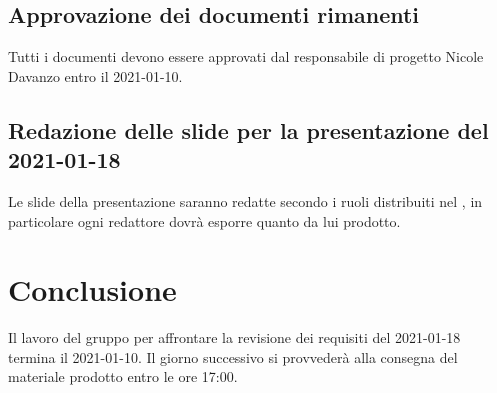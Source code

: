 \subsection{Approvazione dei documenti rimanenti}
Tutti i documenti devono essere approvati dal responsabile di progetto Nicole Davanzo entro il 2021-01-10.

\subsection{Redazione delle slide per la presentazione del 2021-01-18}
Le slide della presentazione saranno redatte secondo i ruoli distribuiti nel \textit{}, in particolare ogni redattore dovrà esporre quanto da lui prodotto.

\section{Conclusione}
Il lavoro del gruppo per affrontare la revisione dei requisiti del 2021-01-18 termina il 2021-01-10. Il giorno successivo si provvederà alla consegna del materiale prodotto entro le ore 17:00.


